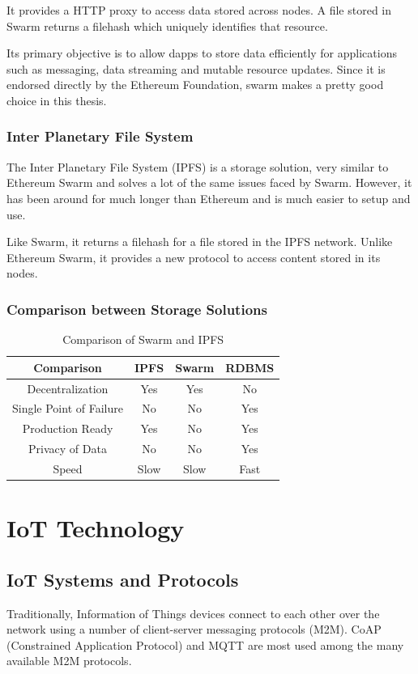 \documentclass[11pt,openright]{report}
\begin{document}
It provides a HTTP proxy to access data stored across nodes. A file stored in Swarm returns a filehash which uniquely identifies that resource.

Its primary objective is to allow dapps to store data efficiently for applications such as messaging, data streaming and mutable resource updates. Since it is endorsed directly by the Ethereum Foundation, swarm makes a pretty good choice in this thesis.


\subsection{Inter Planetary File System}
The Inter Planetary File System (IPFS) \cite{ipfs2014} is a storage solution, very similar to Ethereum Swarm and solves a lot of the same issues faced by Swarm. However, it has been around for much longer than Ethereum and is much easier to setup and use.

Like Swarm, it returns a filehash for a file stored in the IPFS network. Unlike Ethereum Swarm, it provides a new protocol to access content stored in its nodes.

\subsection{Comparison between Storage Solutions}
\begin{table}[!htbp]
	\renewcommand{\arraystretch}{1.3}
	\caption{Comparison of Swarm and IPFS}
	\label{swarm_eth_comparison}
	\centering
	\begin{tabular}{|c||c|c|c|}
		\hline
		\bfseries Comparison & \bfseries IPFS & \bfseries Swarm & \bfseries RDBMS \\
		\hline\hline
		Decentralization & Yes & Yes & No \\ \hline
		Single Point of Failure & No & No & Yes \\ \hline
		Production Ready & Yes & No & Yes \\ \hline
		Privacy of Data & No & No & Yes \\ \hline
		Speed & Slow & Slow & Fast \\ \hline

	\end{tabular}
\end{table}
\chapter{IoT Technology}
\label{chapter:iot_tech}
\section{IoT Systems and Protocols}
Traditionally, Information of Things devices connect to each other over the network using a number of client-server messaging protocols (M2M). CoAP (Constrained Application Protocol) and MQTT are most used among the many available M2M protocols.
\end{document}
